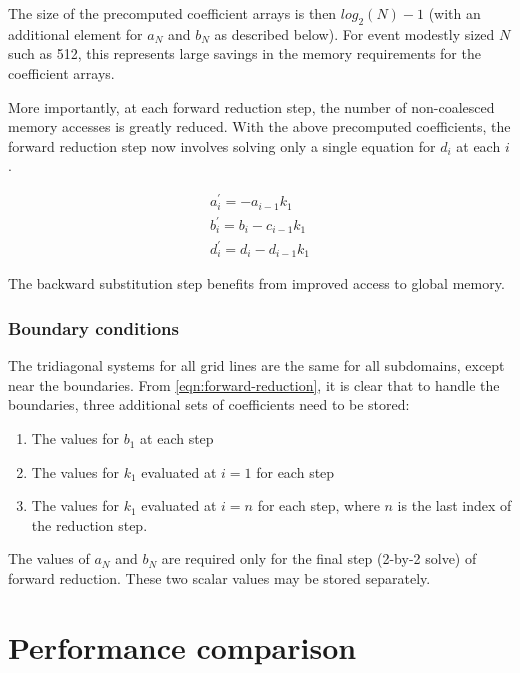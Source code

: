 \documentclass{article}
\begin{document}
        The size of the precomputed coefficient arrays is then $log_2(N)-1$
        (with an additional element for $a_N$ and $b_N$ as described below).
        For event modestly sized $N$ such as 512, this represents large savings
        in the memory requirements for the coefficient arrays.

        More importantly, at each forward reduction step,
        the number of non-coalesced memory accesses is greatly reduced.
        With the above precomputed coefficients,
        the forward reduction step now involves solving only a single equation
        for $d_i$ at each $i$.

        \begin{align} \label{eqn:forward-reduction-right}
            & a^{\prime}_i = -a_{i-1}k_1 & \\
            & b^{\prime}_i = b_i - c_{i-1}k_1 & \\
            & d^{\prime}_i = d_i - d_{i-1}k_1 &
        \end{align}

        The backward substitution step benefits from improved access to
        global memory.

        \subsubsection*{Boundary conditions}

        The tridiagonal systems for all grid lines are the same for all subdomains,
        except near the boundaries.
        From \ref{eqn:forward-reduction}, it is clear that
        to handle the boundaries, three additional sets of coefficients
        need to be stored:

        \begin{enumerate}
         \item The values for $b_1$ at each step
         \item The values for $k_1$ evaluated at $i=1$ for each step
         \item The values for $k_1$ evaluated at $i=n$ for each step,
            where $n$ is the last index of the reduction step.
        \end{enumerate}

        The values of $a_N$ and $b_N$ are required only for the
        final step (2-by-2 solve) of forward reduction.
        These two scalar values may be stored separately.

\section{Performance comparison}
\end{document}
